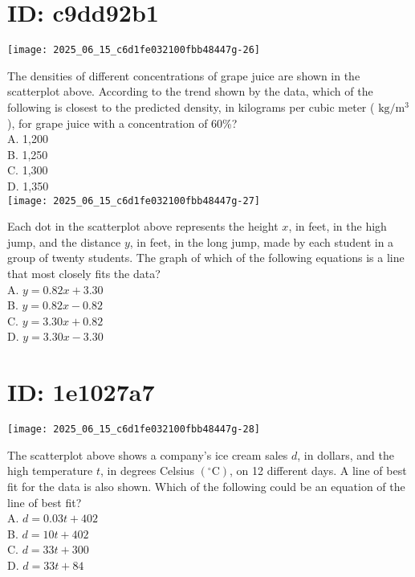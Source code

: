 \section*{ID: c9dd92b1}
\begin{center}
\texttt{[image: 2025\_06\_15\_c6d1fe032100fbb48447g-26]}
\end{center}

The densities of different concentrations of grape juice are shown in the scatterplot above. According to the trend shown by the data, which of the following is closest to the predicted density, in kilograms per cubic meter ( $\mathrm{kg} / \mathrm{m}^{3}$ ), for grape juice with a concentration of 60\%?\\
A. 1,200\\
B. 1,250\\
C. 1,300\\
D. 1,350\\
\texttt{[image: 2025\_06\_15\_c6d1fe032100fbb48447g-27]}

Each dot in the scatterplot above represents the height $x$, in feet, in the high jump, and the distance $y$, in feet, in the long jump, made by each student in a group of twenty students. The graph of which of the following equations is a line that most closely fits the data?\\
A. $y=0.82 x+3.30$\\
B. $y=0.82 x-0.82$\\
C. $y=3.30 x+0.82$\\
D. $y=3.30 x-3.30$

\section*{ID: 1e1027a7}
\begin{center}
\texttt{[image: 2025\_06\_15\_c6d1fe032100fbb48447g-28]}
\end{center}

The scatterplot above shows a company's ice cream sales $d$, in dollars, and the high temperature $t$, in degrees Celsius $\left({ }^{\circ} \mathrm{C}\right)$, on 12 different days. A line of best fit for the data is also shown. Which of the following could be an equation of the line of best fit?\\
A. $d=0.03 t+402$\\
B. $d=10 t+402$\\
C. $d=33 t+300$\\
D. $d=33 t+84$

